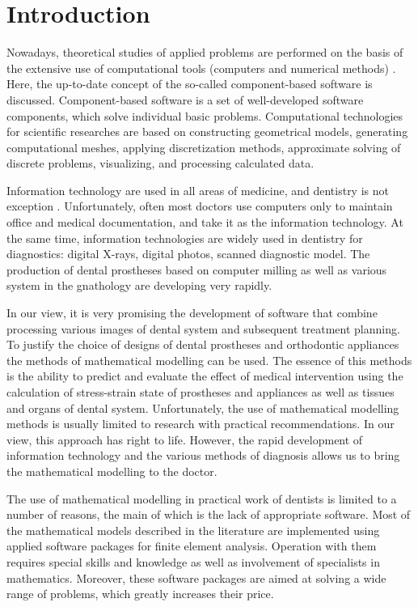 \documentclass{elsarticle}
\begin{document}
\section{Introduction}

Nowadays, theoretical studies of applied problems are performed on the
basis of the extensive use of computational tools (computers and
numerical methods) \cite{Sam2001,Hri2003}.  Here, the up-to-date
concept of the so-called component-based software
\cite{wang2005component,liu2006mathematical} is discussed.
Component-based software is a set of well-developed software
components, which solve individual basic problems.  Computational
technologies for scientific researches are based on constructing
geometrical models, generating computational meshes, applying
discretization methods, approximate solving of discrete problems,
visualizing, and processing calculated data.

Information technology are used in all areas of medicine, and
dentistry is not exception \cite{book:1078699}. Unfortunately, often
most doctors use computers only to maintain office and medical
documentation, and take it as the information technology.  At the same
time, information technologies are widely used in dentistry for
diagnostics: digital X-rays, digital photos, scanned diagnostic
model. The production of dental prostheses based on computer milling
\cite{book:1375379} as well as various system in the gnathology are
developing very rapidly.

In our view, it is very promising the development of software that
combine processing various images of dental system and subsequent
treatment planning.
To justify the choice of designs of dental prostheses and orthodontic
appliances the methods of mathematical modelling can be used. The
essence of this methods is the ability to predict and evaluate the effect of
medical intervention using the calculation of stress-strain state
of prostheses and appliances as well as tissues and organs of dental
system. Unfortunately, the use of mathematical modelling methods is
usually limited to research with practical recommendations. In our
view, this approach has right to life. However, the rapid development of
information technology and the various methods of diagnosis allows us
to bring the mathematical modelling to the doctor.

The use of mathematical modelling in practical work of dentists is
limited to a number of reasons, the main of which is the lack of
appropriate software. Most of the mathematical models described in the
literature are implemented using applied software packages for finite element
analysis. Operation with them requires special skills and knowledge as
well as involvement of specialists in mathematics. Moreover, these
software packages are aimed at solving a wide range of problems, which
greatly increases their price.
\end{document}
